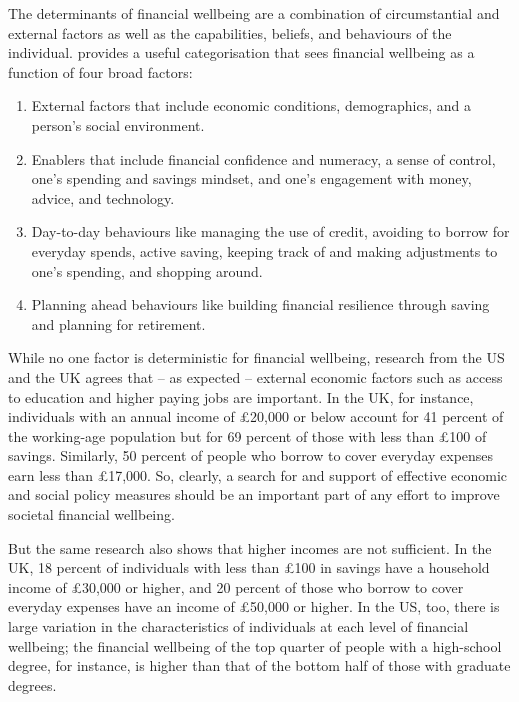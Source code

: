 The determinants of financial wellbeing are a combination of circumstantial and
external factors as well as the capabilities, beliefs, and behaviours of the
individual. \citet{mps2018building} provides a useful categorisation that sees
financial wellbeing as a function of four broad factors:

\begin{enumerate}
    \item External factors that
    include economic conditions, demographics, and a person's social environment.
    
    \item Enablers that include financial confidence and numeracy, a sense of control,
    one's spending and savings mindset, and one's engagement with money, advice, and
    technology.
    
    \item Day-to-day behaviours like managing the use of credit, avoiding to
    borrow for everyday spends, active saving, keeping track of and making
    adjustments to one's spending, and shopping around.
    
    \item Planning ahead
    behaviours like building financial resilience through saving and planning for
    retirement.
\end{enumerate}

While no one factor is deterministic for financial wellbeing, research from the
US \citep{cfpb2017financial} and the UK \citep{mps2018building} agrees that -- as
expected -- external economic factors such as access to education and higher
paying jobs are important. In the UK, for instance, individuals with an annual
income of \pounds20,000 or below account for 41 percent of the working-age
population but for 69 percent of those with less than \pounds100 of savings.
Similarly, 50 percent of people who borrow to cover everyday expenses earn less
than \pounds17,000. So, clearly, a search for and support of effective economic
and social policy measures should be an important part of any effort to improve
societal financial wellbeing.

But the same research also shows that higher
incomes are not sufficient. In the UK, 18 percent of individuals with less than
\pounds 100 in savings have a household income of \pounds30,000 or higher, and
20 percent of those who borrow to cover everyday expenses have an income of
\pounds50,000 or higher. In the US, too, there is large variation in the
characteristics of individuals at each level of financial wellbeing; the
financial wellbeing of the top quarter of people with a high-school degree, for
instance, is higher than that of the bottom half of those with graduate
degrees.

